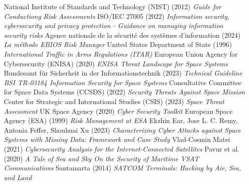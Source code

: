 \documentclass[binding=0.6cm]{sapthesis}
\begin{document}
\begin{thebibliography}{9}
National Institute of Standards and Technology (NIST) (2012) \emph{Guide for Conductiong Risk Assessments}
ISO/IEC 27005 (2022) \emph{Information security, cybersecurity and privacy protection - Guidance on managing information security risks}
Agence nationale de la sécurité des systèmes d'information (2024) \emph{La méthode EBIOS Risk Manager}
United States Department of State (1996) \emph{International Traffic in Arms Regulations (ITAR)}
European Union Agency for Cybersecurity (ENISA) (2020) \emph{ENISA Threat Landscape for Space Systems}
Bundesamt für Sicherheit in der Informationstechnik (2023) \emph{Technical Guideline BSI TR-03184 Information Security for Space Systems}
Consultative Committee for Space Data Systems (CCSDS) (2022) \emph{Security Threats Against Space Mission}
Center for Strategic and International Studies (CSIS) (2023) \emph{Space Threat Assessment}
UK Space Agency (2020) \emph{Cyber Security Toolkit}
European Space Agency (ESA) (1999) \emph{Risk Management at ESA}
Ekzhin Ear, Jose L. C. Remy, Antonia Feffer, Shouhuai Xu (2023) \emph{Characterizing Cyber Attacks against Space Systems with Missing Data: Framework and Case Study}
Vlad-Cosmin Matei (2021) \emph{Cybersecurity Analysis for the Internet-Connected Satellites}
Pavur et al. (2020) \emph{A Tale of Sea and Sky On the Security of Maritime VSAT Communications}
Santamarta (2014) \emph{SATCOM Terminals: Hacking by Air, Sea, and Land}
\end{thebibliography}
\end{document}
